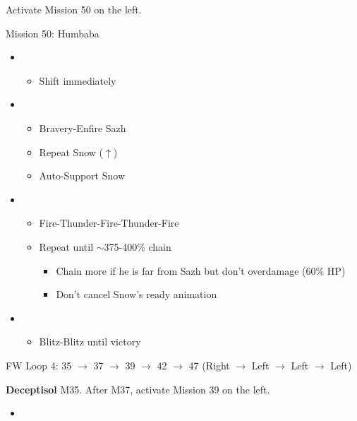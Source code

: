 Activate Mission 50 on the left.

\begin{battle}{Mission 50: Humbaba}
	\begin{itemize}
		\item \second
			\begin{itemize}
				\item Shift immediately
			\end{itemize}
		\item \third
			\begin{itemize}
				\item Bravery-Enfire Sazh
				\item Repeat Snow ($\uparrow$)
				\item Auto-Support Snow
			\end{itemize}
		\item \fourth
			\begin{itemize}
				\item Fire-Thunder-Fire-Thunder-Fire
				\item Repeat until $\sim$375-400\% chain
					\begin{itemize}
						\item Chain more if he is far from Sazh but don't overdamage (60\% HP)
						\item Don't cancel Snow's ready animation
					\end{itemize}
			\end{itemize}
		\item \first
			\begin{itemize}
				\item Blitz-Blitz until victory
			\end{itemize}												
	\end{itemize}
\end{battle}

FW Loop 4: 35 $\rightarrow$ 37 $\rightarrow$ 39 $\rightarrow$ 42 $\rightarrow$ 47 (Right $\rightarrow$ Left $\rightarrow$ Left $\rightarrow$ Left)

\textbf{Deceptisol} M35.
After M37, activate Mission 39 on the left.

\begin{menu}
	\begin{itemize}
	\paradigm
		\begin{itemize}
			\item {}%
				{\paradigmline{\com}{(\sen)}{\med}}%
				{\paradigmline{\com}{\com}{\sab}}%
				{\paradigmline[4]{\syn}{\sen}{\sab}}%
				{\paradigmline{\rav}{\rav}{\rav}}%
				{\paradigmline{(\sab)}{\sen}{\sab}}%
				{\paradigmline{\rav}{\sen}{\rav}}%
		\end{itemize}
	\end{itemize}
\end{menu}

